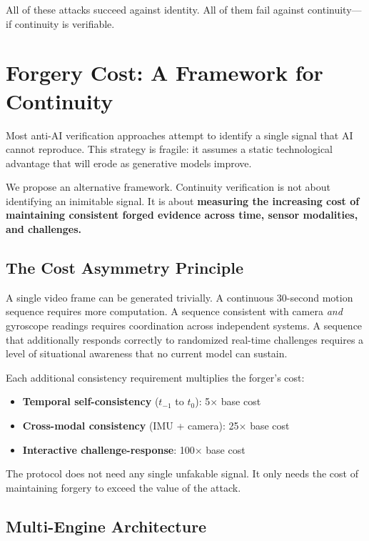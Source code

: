 \documentclass[conference]{IEEEtran}
\begin{document}
All of these attacks succeed against identity. All of them fail against continuity---if continuity is verifiable.

\section{Forgery Cost: A Framework for Continuity}

Most anti-AI verification approaches attempt to identify a single signal that AI cannot reproduce. This strategy is fragile: it assumes a static technological advantage that will erode as generative models improve.

We propose an alternative framework. Continuity verification is not about identifying an inimitable signal. It is about \textbf{measuring the increasing cost of maintaining consistent forged evidence across time, sensor modalities, and challenges.}

\subsection{The Cost Asymmetry Principle}

A single video frame can be generated trivially. A continuous 30-second motion sequence requires more computation. A sequence consistent with camera \textit{and} gyroscope readings requires coordination across independent systems. A sequence that additionally responds correctly to randomized real-time challenges requires a level of situational awareness that no current model can sustain.

Each additional consistency requirement multiplies the forger's cost:
\begin{itemize}
\item \textbf{Temporal self-consistency} ($t_{-1}$ to $t_0$): 5$\times$ base cost
\item \textbf{Cross-modal consistency} (IMU + camera): 25$\times$ base cost
\item \textbf{Interactive challenge-response}: 100$\times$ base cost
\end{itemize}

The protocol does not need any single unfakable signal. It only needs the cost of maintaining forgery to exceed the value of the attack.

\subsection{Multi-Engine Architecture}
\end{document}

